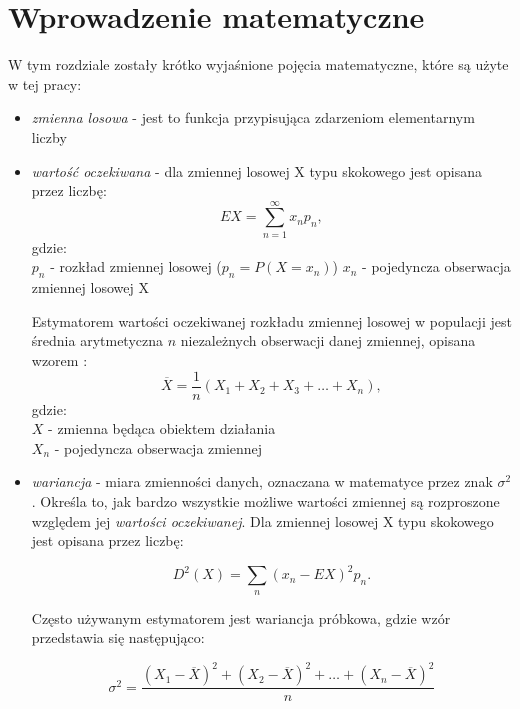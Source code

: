 \documentclass[magister]{dyplom}
\begin{document}
\chapter{Wprowadzenie matematyczne}
W tym rozdziale zostały krótko wyjaśnione pojęcia matematyczne, które są użyte w tej pracy:\\
\begin{itemize}
\item \textit{zmienna losowa} - jest to funkcja przypisująca zdarzeniom elementarnym liczby\cite{random_variable}\newline 

\item \textit{wartość oczekiwana} - dla zmiennej losowej X typu skokowego jest opisana przez liczbę:
\begin{equation}
	EX = \sum_{n=1}^{\infty}x_np_n,
\end{equation}
gdzie:\\
$p_n$ - rozkład zmiennej losowej ($p_n = P(X = x_n)$)
$x_n$ - pojedyncza obserwacja zmiennej losowej X

Estymatorem wartości oczekiwanej rozkładu zmiennej losowej w populacji jest średnia arytmetyczna $n$ niezależnych obserwacji danej zmiennej, opisana wzorem \cite{expected_value}:
\begin{equation}
	\overline{X} = \frac{1}{n}(X_1 + X_2 + X_3 + \dots + X_n),
\end{equation}
gdzie:\\
$X$ - zmienna będąca obiektem działania\\
$X_n$ - pojedyncza obserwacja zmiennej\newline

\item \textit{wariancja} - miara zmienności danych, oznaczana w matematyce przez znak $\sigma^2$. Określa to, jak bardzo wszystkie możliwe wartości zmiennej są rozproszone względem jej \textit{wartości oczekiwanej}. Dla zmiennej losowej X typu skokowego jest opisana przez liczbę:

\begin{equation}
	D^2(X) = \sum_n(x_n - EX)^2p_n.
\end{equation}

Często używanym estymatorem jest wariancja próbkowa, gdzie wzór przedstawia się następująco:

\begin{equation}
	\sigma^2 = \frac{(X_1 - \overline{X})^2 + (X_2 - \overline{X})^2 + \dots + (X_n - \overline{X})^2}{n}
\end{equation}


\end{itemize}
\end{document}
